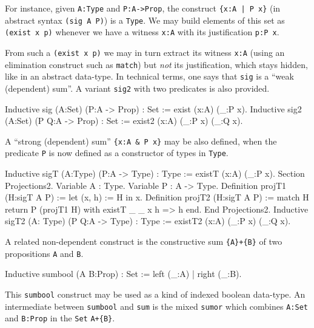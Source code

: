 For instance, given \verb|A:Type| and \verb|P:A->Prop|, the construct
\verb+{x:A | P x}+ (in abstract syntax \verb+(sig A P)+) is a
\verb:Type:. We may build elements of this set as \verb:(exist x p):
whenever we have a witness \verb|x:A| with its justification
\verb|p:P x|.

From such a \verb:(exist x p): we may in turn extract its witness
\verb|x:A| (using an elimination construct such as \verb:match:) but
{\sl not} its justification, which stays hidden, like in an abstract
data-type. In technical terms, one says that \verb:sig: is a ``weak
(dependent) sum''.  A variant \verb:sig2: with two predicates is also
provided.


\begin{coq_example*}
Inductive sig (A:Set) (P:A -> Prop) : Set := exist (x:A) (_:P x).
Inductive sig2 (A:Set) (P Q:A -> Prop) : Set := 
  exist2 (x:A) (_:P x) (_:Q x).
\end{coq_example*}

A ``strong (dependent) sum'' \verb+{x:A & P x}+ may be also defined,
when the predicate \verb:P: is now defined as a 
constructor of types in \verb:Type:.

\ttindex{\&}

\begin{coq_example*}
Inductive sigT (A:Type) (P:A -> Type) : Type := existT (x:A) (_:P x).
Section Projections2.
Variable A : Type.
Variable P : A -> Type.
Definition projT1 (H:sigT A P) := let (x, h) := H in x.
Definition projT2 (H:sigT A P) :=
  match H return P (projT1 H) with
    existT _ _ x h => h
  end.
End Projections2.
Inductive sigT2 (A: Type) (P Q:A -> Type) : Type :=
    existT2 (x:A) (_:P x) (_:Q x).
\end{coq_example*}

A related non-dependent construct is the constructive sum
\verb"{A}+{B}" of two propositions \verb:A: and \verb:B:.
\label{sumbool}

\begin{coq_example*}
Inductive sumbool (A B:Prop) : Set := left (_:A) | right (_:B).
\end{coq_example*}

This \verb"sumbool" construct may be used as a kind of indexed boolean
data-type. An intermediate between \verb"sumbool" and \verb"sum" is
the mixed \verb"sumor" which combines \verb"A:Set" and \verb"B:Prop"
in the \verb"Set" \verb"A+{B}".

